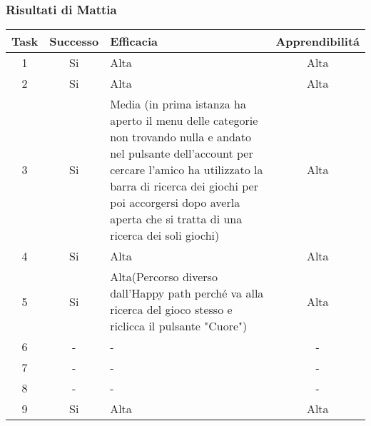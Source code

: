 \documentclass[../Report.tex]{subfiles}
\begin{document}
    \subsubsection{Risultati di Mattia}
    \begin{table}[H]
        \begin{tabular}{|c|c|p{5cm}|c|}
            \hline
            Task & Successo & Efficacia & Apprendibilitá \\
            \hline
            1 & Si & Alta & Alta \\
            \hline
            2 & Si & Alta & Alta \\
            \hline
            3 & Si & Media (in prima istanza ha aperto il menu delle categorie non trovando nulla e andato nel pulsante dell'account per cercare l'amico ha utilizzato la barra di ricerca dei giochi per poi accorgersi dopo averla aperta che si tratta di una ricerca dei soli giochi) & Alta \\
            \hline
            4 & Si & Alta  & Alta \\
            \hline
            5 & Si  & Alta(Percorso diverso dall'Happy path perché va alla ricerca del gioco stesso e riclicca il pulsante "Cuore") & Alta \\
            \hline
            6 & - & -  & - \\
            \hline
            7 & - & - & - \\
            \hline
            8 & - & - & - \\
            \hline
            9 & Si & Alta & Alta \\
            \hline
        \end{tabular}

        
    \end{table}
\end{document}
